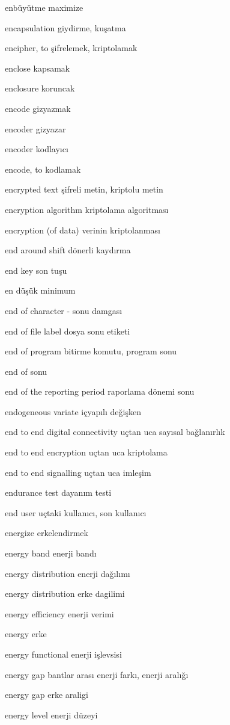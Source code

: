 \documentclass[12pt,fleqn]{article}\usepackage{../../common}
\begin{document}
enbüyütme maximize

encapsulation giydirme, kuşatma

encipher, to şifrelemek, kriptolamak

enclose kapsamak

enclosure koruncak

encode gizyazmak

encoder gizyazar

encoder kodlayıcı

encode, to kodlamak

encrypted text şifreli metin, kriptolu metin

encryption algorithm kriptolama algoritması

encryption (of data) verinin kriptolanması

end around shift dönerli kaydırma

end key son tuşu

en düşük minimum

end of character - sonu damgası

end of file label dosya sonu etiketi

end of program bitirme komutu, program sonu

end of sonu

end of the reporting period raporlama dönemi sonu

endogeneous variate içyapılı değişken

end to end digital connectivity uçtan uca sayısal bağlanırlık

end to end encryption uçtan uca kriptolama

end to end signalling uçtan uca imleşim

endurance test dayanım testi

end user uçtaki kullanıcı, son kullanıcı

energize erkelendirmek

energy band enerji bandı

energy distribution enerji dağılımı

energy distribution erke dagilimi

energy efficiency enerji verimi

energy erke

energy functional enerji işlevsisi

energy gap bantlar arası enerji farkı, enerji aralığı

energy gap erke araligi

energy level enerji düzeyi
\end{document}
